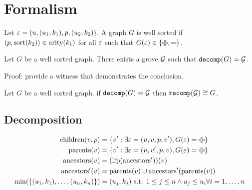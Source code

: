 \section{Formalism}

\begin{definition}
  Let $\varepsilon = (u, (u_1, k_1), p, (u_2, k_2))$.
  A graph $G$ is well sorted if $(p, \operatorname{\text{sort}}(k_2)) \in \operatorname{\text{arity}}(k_1)$
  for all $\varepsilon$ such that $G(\e) \in \{\Plus, \Minus\}$.
\end{definition}

\begin{theorem}
  Let $G$ be a well sorted graph.
  There exists a grove $\mathcal{G}$ such that $\operatorname{\texttt{decomp}}\mathopen{}\left(G\right)\mathclose{} = \mathcal{G}$.
\end{theorem}

Proof: provide a witness that demonstrates the conclusion.



\begin{theorem}
  Let $G$ be a well sorted graph.
  if $\operatorname{\texttt{decomp}}\mathopen{}\left(G\right)\mathclose{} = \mathcal{G}$ then $\operatorname{\texttt{recomp}}\mathopen{}\left(\mathcal{G}\right)\mathclose{} \cong G$.
\end{theorem}


\subsection{Decomposition}

\begin{align*}
  \children(v, p) &= \SetOf{v' \SuchThat{\exists \e = (u, v, p, v'), G(\e) = \Plus}} \\
  \parents(v) &= \SetOf{v' \SuchThat{\exists \e = (u, v', p, v), G(\e) = \Plus}} \\
  \ancestors(v) &= \mathopen{}\left( \lfp(\ancestors') \right)\mathclose{}(v) \\
  \ancestors'(v) &= \parents(v) \cup \ancestors'(\parents(v)) \\
  \min\mathopen{}\left(\SetOf{(u_1, k_1), \ldots, (u_n, k_n)}\right)\mathclose{} &= (u_j, k_j) \text{ s.t. } 1 \leq j \leq n \land u_j \le u_i \forall i = 1, \ldots, n
\end{align*}

